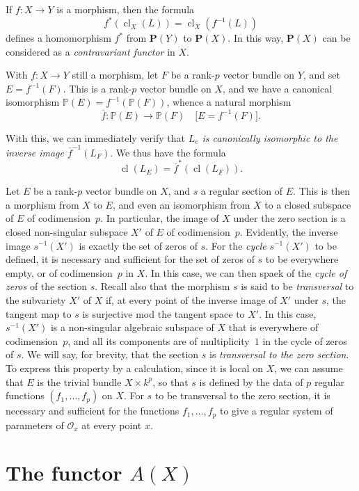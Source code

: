 \documentclass{article}
\theoremstyle{plain}
\theoremstyle{definition}
\newcommand{\sh}[1]{{\mathscr{#1}}}
\newcommand{\PP}{\mathbf{P}}
\DeclareMathOperator{\cl}{cl}
\begin{document}
If $f\colon X\to Y$ is a morphism, then the formula
\[
  f^*(\cl_X(L)) = \cl_X(f^{-1}(L))
\]
defines a homomorphism $f^*$ from $\PP(Y)$ to $\PP(X)$.
In this way, $\PP(X)$ can be considered as a \emph{contravariant functor} in $X$.

With $f\colon X\to Y$ still a morphism, let $F$ be a rank-$p$ vector bundle on $Y$, and set $E=f^{-1}(F)$.
This is a rank-$p$ vector bundle on $X$, and we have a canonical isomorphism $\mathbb{P}(E)=f^{-1}(\mathbb{P}(F))$, whence a natural morphism
\[
  \overline{f}\colon \mathbb{P}(E) \to \mathbb{P}(F)
  \quad\mbox{[$E=f^{-1}(F)$].}
\]

With this, we can immediately verify that \emph{$L_e$ is canonically isomorphic to the inverse image $\overline{f}^{-1}(L_F)$}.
We thus have the formula
\[
  \cl(L_E) = \overline{f}^*(\cl(L_F)).
\]

Let $E$ be a rank-$p$ vector bundle on $X$, and $s$ a regular section of $E$.
This is then a morphism from $X$ to $E$, and even an isomorphism from $X$ to a closed subspace of $E$ of codimension~$p$.
In particular, the image of $X$ under the zero section is a closed non-singular subspace $X'$ of $E$ of codimension~$p$.
Evidently, the inverse image $s^{-1}(X')$ is exactly the set of zeros of $s$.
For the \emph{cycle} $s^{-1}(X')$ to be defined, it is necessary and sufficient for the set of zeros of $s$ to be everywhere empty, or of codimension~$p$ in $X$.
In this case, we can then spaek of the \emph{cycle of zeros} of the section $s$.
Recall also that the morphism $s$ is said to be \emph{transversal} to the subvariety $X'$ of $X$ if, at every point of the inverse image of $X'$ under $s$, the tangent map to $s$ is surjective mod the tangent space to $X'$.
In this case, $s^{-1}(X')$ is a non-singular algebraic subspace of $X$ that is everywhere of codimension~$p$, and all its components are of multiplicity~$1$ in the cycle of zeros of $s$.
We will say, for brevity, that the section $s$ is \emph{transversal to the zero section}.
To express this property by a calculation, since it is local on $X$, we can assume that $E$ is the trivial bundle $X\times k^p$, so that $s$ is defined by the data of $p$ regular functions $(f_1,\ldots,f_p)$ on $X$.
For $s$ to be transversal to the zero section, it is necessary and sufficient for the functions $f_1,\ldots,f_p$ to give a regular system of parameters of $\sh{O}_x$ at every point $x$.


\section{The functor \texorpdfstring{$A(X)$}{A(X)}}
\label{section2}
\end{document}
